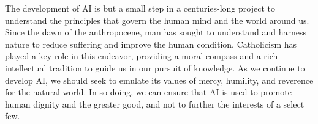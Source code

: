 \documentclass[sigplan,nonacm]{acmart}\settopmatter{printfolios=false,printccs=false,printacmref=false}
\begin{document}
The development of AI is but a small step in a centuries-long project to understand the principles that govern the human mind and the world around us. Since the dawn of the anthropocene, man has sought to understand and harness nature to reduce suffering and improve the human condition. Catholicism has played a key role in this endeavor, providing a moral compass and a rich intellectual tradition to guide us in our pursuit of knowledge. As we continue to develop AI, we should seek to emulate its values of mercy, humility, and reverence for the natural world. In so doing, we can ensure that AI is used to promote human dignity and the greater good, and not to further the interests of a select few.


\clearpage
\end{document}
